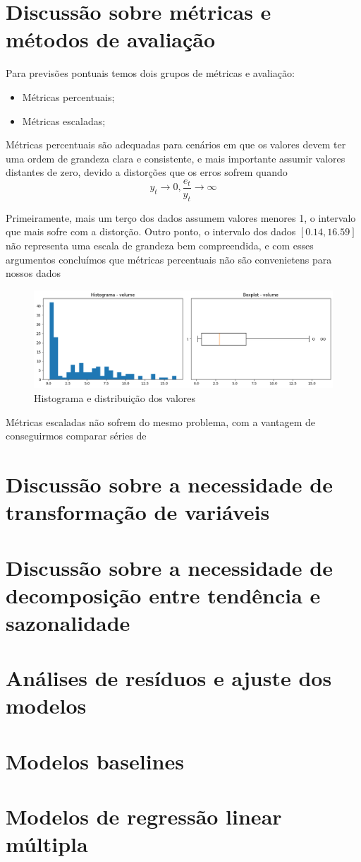 \documentclass{article}
\begin{document}
\section{Discussão sobre métricas e métodos de avaliação}

Para previsões pontuais temos dois grupos de métricas e avaliação:
\begin{itemize}
    \item Métricas percentuais;
    \item Métricas escaladas;
\end{itemize}

Métricas percentuais são adequadas para cenários em que os valores devem ter uma ordem de grandeza clara e consistente, e mais importante assumir valores distantes de zero, devido a distorções que os erros sofrem quando $$y_t \to 0, \dfrac{e_t}{y_t} \to \infty$$

 Primeiramente, mais um terço dos dados assumem valores menores 1, o intervalo que mais sofre com a distorção. Outro ponto, o intervalo dos dados $[0.14 , 16.59]$ não representa uma escala de grandeza bem compreendida, e com esses argumentos concluímos que métricas percentuais não são convenietens para nossos dados

\begin{figure}[h]
    \centering
    \includegraphics[width=0.75\linewidth]{images/histogram.png}
    \caption{Histograma e distribuição dos valores}
\end{figure}

Métricas escaladas não sofrem do mesmo problema, com a vantagem de conseguirmos comparar séries de 



\section{Discussão sobre a necessidade de transformação de variáveis}


\section{Discussão sobre a necessidade de decomposição entre tendência e sazonalidade}

\section{Análises de resíduos e ajuste dos modelos}
\section{Modelos baselines}

\section{Modelos de regressão linear múltipla}
\end{document}
